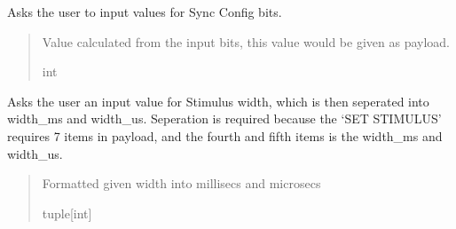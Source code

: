 \documentclass[letterpaper,10pt,english]{sphinxmanual}
\begin{document}
\begin{fulllineitems}
\begin{fulllineitems}
\end{fulllineitems}


\begin{fulllineitems}
\label{\detokenize{Setup_8480SC:Setup_8480SC.Setup_8480SC._ChooseSyncConfig}}
\pysigstartsignatures
{}
\pysigstopsignatures
\sphinxAtStartPar
Asks the user to input values for Sync Config bits.
\begin{quote}\begin{description}
\sphinxAtStartPar
Value calculated from the input bits, this value would be given as payload.

\sphinxAtStartPar
int

\end{description}\end{quote}

\end{fulllineitems}


\begin{fulllineitems}
\label{\detokenize{Setup_8480SC:Setup_8480SC.Setup_8480SC._ChooseWidth}}
\pysigstartsignatures
{}
\pysigstopsignatures
\sphinxAtStartPar
Asks the user an input value for Stimulus width, which is then seperated into width\_ms and width\_us.         Seperation is required because the ‘SET STIMULUS’ requires 7 items in payload, and the fourth and fifth items         is the width\_ms and width\_us.
\begin{quote}\begin{description}
\sphinxAtStartPar
Formatted given width into millisecs and microsecs

\sphinxAtStartPar
tuple{[}int{]}

\end{description}\end{quote}


\end{fulllineitems}
\end{fulllineitems}
\end{document}
